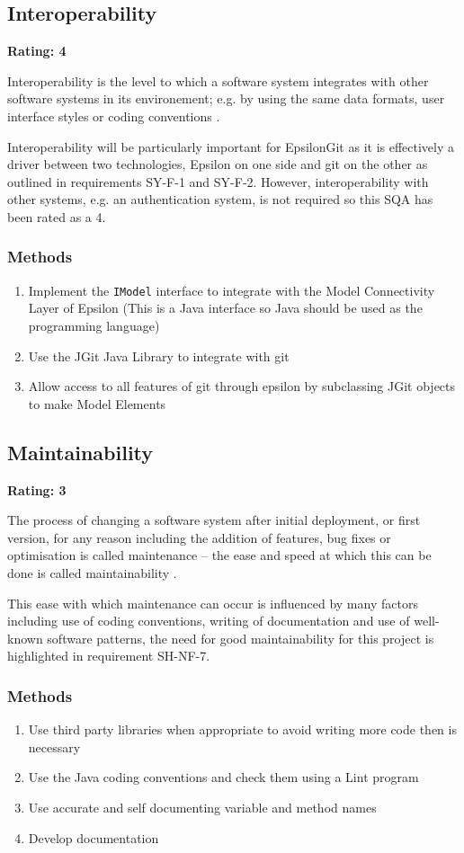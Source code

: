 \documentclass[11pt]{book}
\newcommand{\code}[1]{\texttt{#1}}
\begin{document}
\subsection{Interoperability}
\textbf{Rating: 4}

Interoperability is the level to which a software system integrates with other software systems in its environement; e.g. by using the same data formats, user interface styles or coding conventions \cite{integrationdefinition}.

Interoperability will be particularly important for EpsilonGit as it is effectively a driver between two technologies, Epsilon on one side and git on the other as outlined in requirements SY-F-1 and SY-F-2. However, interoperability with other systems, e.g. an authentication system, is not required so this SQA has been rated as a 4.

\subsubsection{Methods}
\begin{enumerate}
	\item Implement the \code{IModel} interface to integrate with the Model Connectivity Layer of Epsilon (This is a Java interface so Java should be used as the programming language) 
	\item Use the JGit Java Library to integrate with git
	\item Allow access to all features of git through epsilon by subclassing JGit objects to make Model Elements
\end{enumerate}

\subsection{Maintainability}
\textbf{Rating: 3}

The process of changing a software system after initial deployment, or first version, for any reason including the addition of features, bug fixes or optimisation is called maintenance -- the ease and speed at which this can be done is called maintainability \cite{maintainabilitydefinition}. 

This ease with which maintenance can occur is influenced by many factors including use of coding conventions, writing of documentation and use of well-known software patterns, the need for good maintainability for this project is highlighted in requirement SH-NF-7.

\subsubsection{Methods}
\begin{enumerate}
	\item Use third party libraries when appropriate to avoid writing more code then is necessary
	\item Use the Java coding conventions and check them using a Lint program
	\item Use accurate and self documenting variable and method names
	\item Develop documentation
\end{enumerate}
\end{document}
